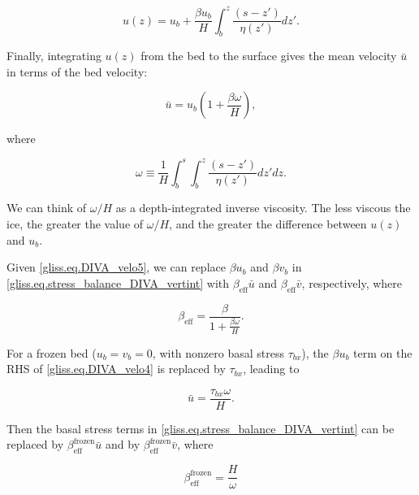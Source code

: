 {\begin{equation}
  \label{gliss.eq.DIVA_velo4}
  u(z) = u_b + \frac{\beta {{u}_{b}}}{H}\int_{b}^{z}{\frac{\left( s-{z}' \right)}{\eta ({z}')}}d{z}'.
\end{equation}

\noindent
Finally, integrating $u(z)$ from the bed to the surface gives the mean velocity $\bar{u}$
in terms of the bed velocity:

\begin{equation}
  \label{gliss.eq.DIVA_velo5}
  \bar{u} = {{u}_{b}}\left( 1+\frac{\beta \omega }{H} \right),
\end{equation}

\noindent
where

\begin{equation}
  \label{gliss.eq.DIVA_omega}
  \omega \equiv \frac{1}{H}\int_{b}^{s}{\int_{b}^{z}{\frac{\left( s-{z}' \right)}{\eta ({z}')}}}d{z}'dz.
\end{equation}

\noindent
We can think of $\omega/H$ as a depth-integrated inverse viscosity.
The less viscous the ice, the greater the value of $\omega/H$, and
the greater the difference between $u(z)$ and $u_b$.  

Given \eqref{gliss.eq.DIVA_velo5}, we can replace $\beta u_b$ and $\beta v_b$ in 
\eqref{gliss.eq.stress_balance_DIVA_vertint} with
$\beta_\mathrm{eff} \bar{u}$ and $\beta_\mathrm{eff} \bar{v}$, respectively, where 

\begin{equation}
  \label{gliss.eq.DIVA_effective_beta}
        {{\beta }_{\text{eff}}} = \frac{\beta }{1+\frac{\beta \omega }{H}}.
\end{equation}

\noindent
For a frozen bed ($u_b = v_b = 0$, with nonzero basal stress $\tau_{bx}$), the $\beta u_b$ term
on the RHS of \eqref{gliss.eq.DIVA_velo4} is replaced by $\tau_{bx}$, leading to

\begin{equation}
  \label{gliss.eq.DIVA_frozen_bed}
  \bar{u} = \frac{{{\tau }_{bx}}\omega }{H}.
\end{equation}

\noindent
Then the basal stress terms in \eqref{gliss.eq.stress_balance_DIVA_vertint} can be replaced
by $\beta_\text{eff}^\text{frozen} \bar{u}$ and by $\beta_\text{eff}^\text{frozen} \bar{v}$, where 

\begin{equation}
  \label{gliss.eq.DIVA_effective_beta_frozen}
        \beta_{\text{eff}}^\text{frozen} = \frac{H}{\omega}
\end{equation}

}
